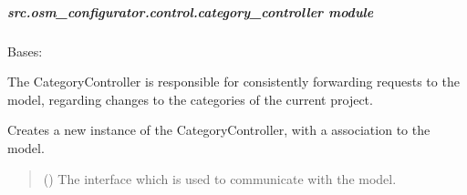\documentclass[letterpaper,10pt,english]{sphinxmanual}
\begin{document}
\subparagraph{src.osm\_configurator.control.category\_controller module}
\label{\detokenize{apidoc/src.osm_configurator.control:module-src.osm_configurator.control.category_controller}}\label{\detokenize{apidoc/src.osm_configurator.control:src-osm-configurator-control-category-controller-module}}

\begin{fulllineitems}
\label{\detokenize{apidoc/src.osm_configurator.control:src.osm_configurator.control.category_controller.CategoryController}}
\pysigstartsignatures
{}
\pysigstopsignatures
\sphinxAtStartPar
Bases: 

\sphinxAtStartPar
The CategoryController is responsible for consistently forwarding requests to the model, regarding changes to the categories of the current project.

\begin{fulllineitems}
\label{\detokenize{apidoc/src.osm_configurator.control:src.osm_configurator.control.category_controller.CategoryController.__init__}}
\pysigstartsignatures
{}
\pysigstopsignatures
\sphinxAtStartPar
Creates a new instance of the CategoryController, with a association to the model.
\begin{quote}\begin{description}
\sphinxAtStartPar
{} ({\hyperref[\detokenize{apidoc/src.osm_configurator.model.application:src.osm_configurator.model.application.application_interface.IApplication}]{}}) \textendash{} The interface which is used to communicate with the model.


\end{description}
\end{quote}
\end{fulllineitems}
\end{fulllineitems}
\end{document}

